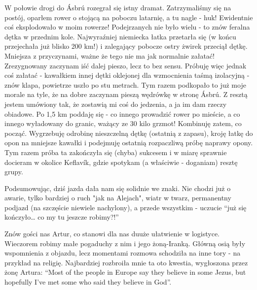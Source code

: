 W połowie drogi do Ásbrú rozegrał się istny dramat. Zatrzymaliśmy się na postój, oparłem rower o stojącą na poboczu latarnię, a tu nagle - huk! Ewidentnie coś eksplodowało w moim rowerze! Podejrzanych nie było wielu - to znów feralna dętka w przednim kole. Najwyraźniej niemiecka łatka przetarła się (w końcu przejechała już blisko 200 km!) i zalegający pobocze ostry żwirek przeciął dętkę. Mniejsza z przyczynami, ważne że tego nie ma jak normalnie załatać! Zrezygnowany zaczynam iść dalej pieszo, lecz to bez sensu. Próbuję więc jednak coś załatać - kawałkiem innej dętki oklejonej dla wzmocnienia taśmą izolacyjną - znów klapa, powietrze uszło po stu metrach. Tym razem podkopało to już moje morale na tyle, że na dobre zaczynam pieszą wędrówkę w stronę Ásbrú. Z resztą jestem umówiony tak, że zostawią mi coś do jedzenia, a ja im dam rzeczy obiadowe. Po 1,5 km poddaję się - co innego prowadzić rower po mieście, a co innego wyładowany do granic, ważący ze 30 kilo grzmot! Kombinuję zatem, co począć. Wygrzebuję odrobinę nieszczelną dętkę (ostatnią z zapasu), kroję łatkę do opon na mniejsze kawałki i podejmuję ostatnią rozpaczliwą próbę naprawy opony. Tym razem próba ta zakończyła się (chyba) sukcesem i w miarę sprawnie docieram w okolice Keflavík, gdzie spotykam (a właściwie - doganiam) resztę grupy.

Podsumowując, dziś jazda dała nam się solidnie we znaki. Nie chodzi już o awarie, tylko bardziej o ruch "jak na Alejach", wiatr w twarz, permanentny podjazd (na szczęście niewiele nachylony), a przede wszystkim - uczucie “już się kończyło… co my tu jeszcze robimy?!”

Znów gości nas Artur, co stanowi dla nas duuże ułatwienie w logistyce. Wieczorem robimy małe pogaduchy z nim i jego żoną-Iranką. Główną osią były wspomnienia z objazdu, lecz momentami rozmowa schodziła na inne tory - na przykład na religię. Najbardziej rozbroiła mnie ta oto kwestia, wygłoszona przez żonę Artura: “Most of the people in Europe say they believe in some Jezus, but hopefully I’ve met some who said they believe in God”.

